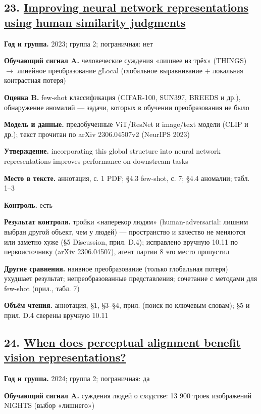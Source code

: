 \subsection*{23. \href{https://doi.org/10.52202/075280-2218}{Improving neural network representations using human similarity judgments}}

\textbf{Год и группа.} 2023; группа 2; пограничная: нет

\textbf{Обучающий сигнал A.} человеческие суждения «лишнее из трёх» (THINGS) $\rightarrow$ линейное преобразование gLocal (глобальное выравнивание + локальная контрастная потеря)

\textbf{Оценка B.} few-shot классификация (CIFAR-100, SUN397, BREEDS и др.), обнаружение аномалий — задачи, которых в обучении преобразования не было

\textbf{Модель и данные.} предобученные ViT/ResNet и image/text модели (CLIP и др.); текст прочитан по arXiv 2306.04507v2 (NeurIPS 2023)

\textbf{Утверждение.} incorporating this global structure into neural network representations improves performance on downstream tasks

\textbf{Место в тексте.} аннотация, с. 1 PDF; §4.3 few-shot, с. 7; §4.4 аномалии; табл. 1–3

\textbf{Контроль.} есть

\textbf{Результат контроля.} тройки «наперекор людям» (human-adversarial: лишним выбран другой объект, чем у людей) — пространство и качество не меняются или заметно хуже (§5 Discussion, прил. D.4); исправлено вручную 10.11 по первоисточнику (arXiv 2306.04507), агент партии 8 это место пропустил

\textbf{Другие сравнения.} наивное преобразование (только глобальная потеря) ухудшает результат; непреобразованные представления; сочетание с методами для few-shot (прил., табл. 7)

\textbf{Объём чтения.} аннотация, §1, §3–§4, прил. (поиск по ключевым словам); §5 и прил. D.4 сверены вручную 10.11


\subsection*{24. \href{https://doi.org/10.52202/079017-1756}{When does perceptual alignment benefit vision representations?}}

\textbf{Год и группа.} 2024; группа 2; пограничная: да

\textbf{Обучающий сигнал A.} суждения людей о сходстве: 13 900 троек изображений NIGHTS (выбор «лишнего»)

